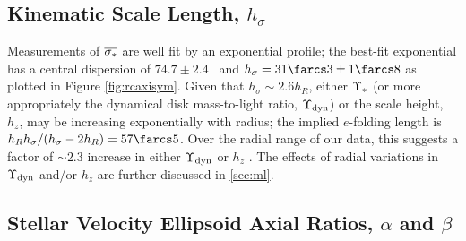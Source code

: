 \documentclass[apj,iop,numberedappendix]{emulateapj}
\begin{document}
\subsection{Kinematic Scale Length, $h_{\sigma}$}
\label{sec:hsigma}

Measurements of $\overline{\sigma_{\ast}}$ are well fit by an exponential profile; the
best-fit exponential has a central dispersion of $74.7\pm2.4$ \kms\ and
$h_{\sigma} = 31\farcs3\pm1\farcs8$ as plotted in Figure \ref{fig:rcaxisym}.
Given that $h_{\sigma} \sim 2.6 h_R$, either $\Upsilon_\ast$ (or more appropriately the
dynamical disk mass-to-light ratio, $\Upsilon_{\rm dyn}$) or the scale height, $h_z$, may be
increasing exponentially with radius; the implied $e$-folding length is $h_R
h_{\sigma}/(h_{\sigma} - 2h_R) = 57\farcs5$.  Over the radial range of our data,
this suggests a factor of $\sim 2.3$ increase in either $\Upsilon_{\rm dyn}$
\citep[consistent with, e.g.:][]{2001ApJ...550..212B, 2009MNRAS.400.1181Z} or
$h_z$ \citep[compare with edge-on galaxy photometry from,
e.g.:][]{1981A&A....95..105V, 1997A&A...320L..21D, 2002A&A...390L..35N,
2002A&A...389..795B, 2006AJ....131..226Y, 2009MNRAS.396..409S}.  The effects of
radial variations in $\Upsilon_{\rm dyn}$ and/or $h_z$ are further discussed in \sect
\ref{sec:ml}.

\subsection{Stellar Velocity Ellipsoid Axial Ratios, $\alpha$ and $\beta$}
\label{sec:sve}
\end{document}
